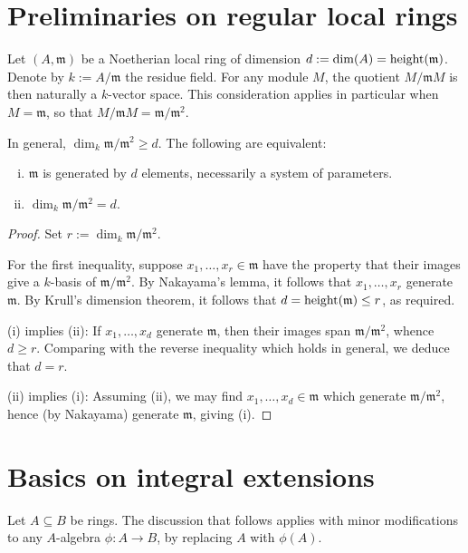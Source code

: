 \documentclass[reqno]{amsart}
\begin{document}
\section{Preliminaries on regular local rings}
\label{sec:org3fde1d4}

Let \((A,\mathfrak{m})\)  be a Noetherian local ring of dimension
\(d := \dim(A) = \operatorname{height}(\mathfrak{m})\).
Denote by \(k := A/\mathfrak{m}\) the residue field.
For any module \(M\),
the quotient \(M/\mathfrak{m} M\) is then naturally a $k$-vector
space.
This consideration applies in particular
when \(M = \mathfrak{m}\),
so that \(M / \mathfrak{m} M = \mathfrak{m} / \mathfrak{m}^2\).
\begin{lemma}
  In general,
  $\dim_k \mathfrak{m} / \mathfrak{m}^2 \geq d$.
  The following are equivalent:
  \begin{enumerate}[(i)]
  \item $\mathfrak{m}$ is generated by $d$ elements,
    necessarily a system of parameters.
  \item $\dim_{k} \mathfrak{m}/\mathfrak{m}^2 = d$.
  \end{enumerate}
\end{lemma}
\begin{proof}
  Set $r := \dim_k \mathfrak{m} / \mathfrak{m}^2$.

  For the first inequality,
  suppose $x_1,\dotsc,x_{r} \in \mathfrak{m}$
  have the property that their images give a $k$-basis of
  $\mathfrak{m} / \mathfrak{m}^2$.
  By Nakayama's lemma,
  it follows that $x_1,\dotsc,x_r$ generate $\mathfrak{m}$.
  By Krull's dimension theorem,
  it follows that $d = \operatorname{height}(\mathfrak{m}) \leq r$,
  as required.

  (i) implies (ii):
  If $x_1,\dotsc,x_d$ generate $\mathfrak{m}$,
  then their images span $\mathfrak{m}/\mathfrak{m}^2$,
  whence $d \geq r$.
  Comparing with the reverse inequality which holds in general,
  we deduce that $d = r$.

  (ii) implies (i):
  Assuming (ii),
  we may find $x_1,\dotsc,x_d \in \mathfrak{m}$ which generate
  $\mathfrak{m}/\mathfrak{m}^2$,
  hence (by Nakayama) generate $\mathfrak{m}$,
  giving (i).
\end{proof}

\section{Basics on integral extensions}
\label{sec:org4afff50}

Let \(A \subseteq B\) be rings.
The discussion that follows
applies with minor modifications to any $A$-algebra
\(\phi : A \rightarrow B\),
by replacing \(A\) with \(\phi(A)\).
\end{document}
